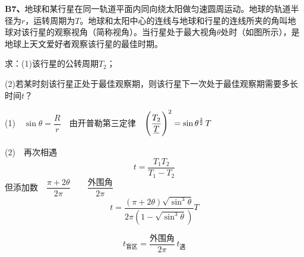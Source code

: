 \begin{problem}[B7]
\textbf{B7、}地球和某行星在同一轨道平面内同向绕太阳做匀速圆周运动。地球的轨道半径为$r$，运转周期为$T$。地球和太阳中心的连线与地球和行星的连线所夹的角叫地球对该行星的观察视角（简称视角）。当行星处于最大视角$\theta$处时（如图所示），是地球上天文爱好者观察该行星的最佳时期。

求：(1)该行星的公转周期$T_2$；

(2)若某时刻该行星正处于最佳观察期，则该行星下一次处于最佳观察期需要多长时间$t$？
\begin{solution}
(1)　$\sin\theta=\dfrac{R}{r}$　由开普勒第三定律　$\left(\dfrac{T_2}{\struck{T}}\right)^{2}=\sin\theta^{\frac{3}{2}}\,T$ %
\medskip

(2)　再次相遇
\[ t=\dfrac{T_1T_2}{T_1-T_2} \]
但添加数　$\dfrac{\pi+2\theta}{2\pi}$　　$\dfrac{\text{外围角}}{2\pi}$
\[ t=\dfrac{(\pi+2\theta)\sqrt{\sin^3\theta}}{2\pi\left(1-\sqrt{\sin^3\theta}\right)}T \]
\end{solution}
\end{problem}
\[ t_{\text{盲区}}=\dfrac{\text{外围角}}{2\pi}\,t_{\text{遇}} \]
